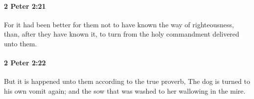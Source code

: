 		\paragraph{2 Peter 2:21} %
			\label{2PETER-2-21}

			For it had been better for them not to have known the way of righteousness, than, after they have known it, to turn from the holy commandment delivered unto them.

			\begin{framed}
			\scriptsize
				\begin{compactdesc}
					\item[SBLG] 
				\end{compactdesc}
			\end{framed}

		\paragraph{2 Peter 2:22} %
			\label{2PETER-2-22}

			But it is happened unto them according to the true proverb, The dog is turned to his own vomit again; and the sow that was washed to her wallowing in the mire.


